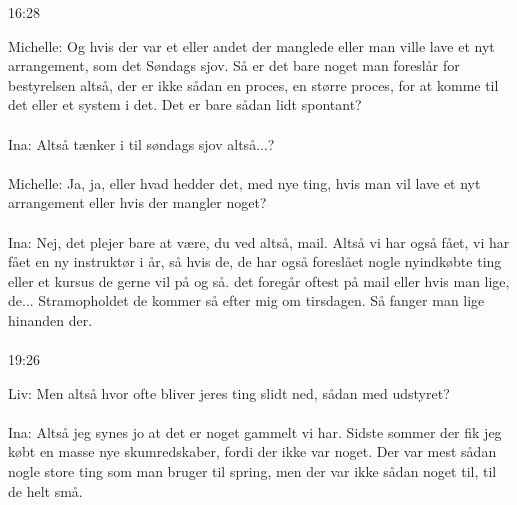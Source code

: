 16:28
\par
Michelle: Og hvis der var et eller andet der manglede eller man ville lave et nyt arrangement, som det Søndags sjov. Så er det bare noget man foreslår for bestyrelsen altså, der er ikke sådan en proces, en større proces, for at komme til det eller et system i det. Det er bare sådan lidt spontant?
\\\\
Ina: Altså tænker i til søndags sjov altså...?
\\\\
Michelle: Ja, ja, eller hvad hedder det, med nye ting, hvis man vil lave et nyt arrangement eller hvis der mangler noget?
\\\\
Ina: Nej, det plejer bare at være, du ved altså, mail. Altså vi har også fået, vi har fået en ny instruktør i år, så hvis de, de har også foreslået nogle nyindkøbte ting eller et kursus de gerne vil på og så. det foregår oftest på mail eller hvis man lige, de... Stramopholdet de kommer så efter mig om tirsdagen. Så fanger man lige hinanden der. 
\\\\
19:26
\par
Liv: Men altså hvor ofte bliver jeres ting slidt ned, sådan med udstyret?
\\\\
Ina: Altså jeg synes jo at det er noget gammelt vi har. Sidste sommer der fik jeg købt en masse nye skumredskaber, fordi der ikke var noget. Der var mest sådan nogle store ting som man bruger til spring, men der var ikke sådan noget til, til de helt små. 





